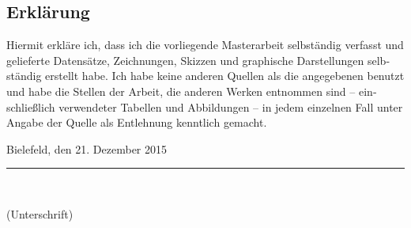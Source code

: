 {\begingroup
\cleardoublepage
\thispagestyle{empty}
\begin{otherlanguage}{ngerman}
\section*{Erklärung}
Hiermit erkläre ich, dass ich die vorliegende Masterarbeit selbständig verfasst und gelieferte Datensätze, Zeichnungen, Skizzen und graphische Darstellungen selbständig erstellt habe. Ich habe keine anderen Quellen als die angegebenen benutzt und habe die Stellen der Arbeit, die anderen Werken entnommen sind -- einschließlich verwendeter Tabellen  und  Abbildungen -- in  jedem  einzelnen Fall unter Angabe der Quelle als Entlehnung kenntlich gemacht. 

\vspace*{2cm}

\noindent
Bielefeld, den 21. Dezember 2015\hfill\rule{5cm}{0.5pt}\par
~\hfill\parbox{5cm}{\small\centering(Unterschrift)}\par
\end{otherlanguage}
\endgroup}


